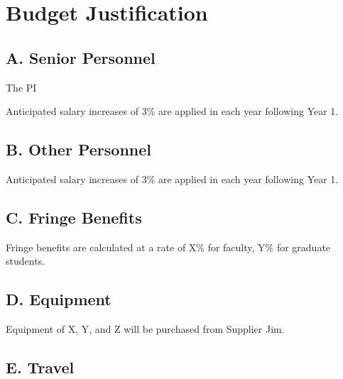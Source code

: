 \section*{\hfil Budget Justification \hfil}
\vspace{-16pt}
\noindent\hrulefill

\subsection*{A. Senior Personnel}

 The PI

Anticipated salary increases of 3\% are applied in each year following Year 1.


\subsection*{B. Other Personnel}

\vspace{10pt}

\vspace{10pt}


Anticipated salary increases of 3\% are applied in each year following Year 1.




\subsection*{C. Fringe Benefits}
Fringe benefits are calculated at a rate of X\% for faculty, Y\% for graduate students.  

\subsection*{D. Equipment}
Equipment of X, Y, and Z will be purchased from Supplier Jim.

\subsection*{E. Travel}

